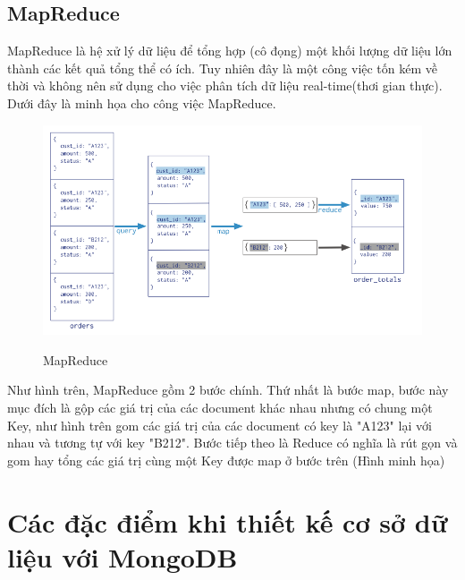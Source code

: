 \subsection{MapReduce}
MapReduce là hệ xử lý dữ liệu để tổng hợp (cô đọng) một khối lượng dữ liệu lớn thành các kết quả tổng thể có ích. Tuy nhiên đây là một công việc tốn kém về thời và không nên sử dụng cho việc phân tích dữ liệu real-time(thơi gian thực). Dưới đây là minh họa cho công việc MapReduce.\\
\begin{figure}[h!]
		\centering
		\includegraphics[scale=0.5]{charts/mapreduce.png}
		\caption{MapReduce}\cite{def3}
		\label{fig:mapreduce}
\end{figure}
Như hình trên, MapReduce gồm 2 bước chính. Thứ nhất là bước map, bước này mục đích là gộp các giá trị của các document khác nhau nhưng có chung một Key, như hình trên gom các giá trị của các document có key là "A123" lại với nhau và tương tự với key "B212". Bước tiếp theo là Reduce có nghĩa là rút gọn và gom hay tổng các giá trị cùng một Key được map ở bước trên (Hình minh họa)


\section{Các đặc điểm khi thiết kế cơ sở dữ liệu với MongoDB}\cite{def2}

